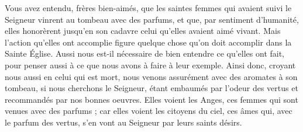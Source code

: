  Vous avez entendu, frères bien-aimés, que les saintes femmes qui avaient suivi le Seigneur vinrent au tombeau avec des parfums, et que, par sentiment d’humanité, elles honorèrent jusqu’en son cadavre celui qu’elles avaient aimé vivant. Mais l’action qu’elles ont accomplie figure quelque chose qu’on doit accomplir dans la Sainte Église. Aussi nous est-il nécessaire de bien entendre ce qu’elles ont fait, pour penser aussi à ce que nous avons à faire à leur exemple. Ainsi donc, croyant nous aussi en celui qui est mort, nous venons assurément avec des aromates à son tombeau, si nous cherchons le Seigneur, étant embaumés par l’odeur des vertus et recommandés par nos bonnes oeuvres. Elles voient les Anges, ces femmes qui sont venues avec des parfums ; car elles voient les citoyens du ciel, ces âmes qui, avec le parfum des vertus, s’en vont au Seigneur par leurs saints désirs.